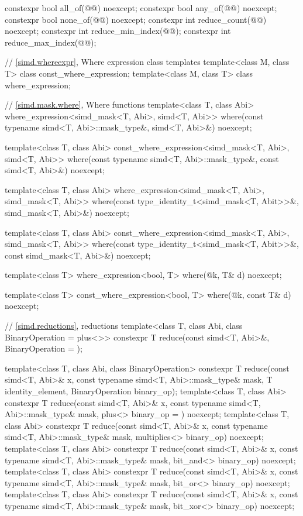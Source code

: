 \begin{codeblock}
{  constexpr bool all_of(@@) noexcept;
  constexpr bool any_of(@@) noexcept;
  constexpr bool none_of(@@) noexcept;
  constexpr int reduce_count(@@) noexcept;
  constexpr int reduce_min_index(@@);
  constexpr int reduce_max_index(@@);

  // \ref{simd.whereexpr}, Where expression class templates
  template<class M, class T> class const_where_expression;
  template<class M, class T> class where_expression;

  // \ref{simd.mask.where}, Where functions
  template<class T, class Abi>
    where_expression<simd_mask<T, Abi>, simd<T, Abi>>
      where(const typename simd<T, Abi>::mask_type&, simd<T, Abi>&) noexcept;

  template<class T, class Abi>
    const_where_expression<simd_mask<T, Abi>, simd<T, Abi>>
      where(const typename simd<T, Abi>::mask_type&, const simd<T, Abi>&) noexcept;

  template<class T, class Abi>
    where_expression<simd_mask<T, Abi>, simd_mask<T, Abi>>
      where(const type_identity_t<simd_mask<T, Abit>>&, simd_mask<T, Abi>&) noexcept;

  template<class T, class Abi>
    const_where_expression<simd_mask<T, Abi>, simd_mask<T, Abi>>
      where(const type_identity_t<simd_mask<T, Abit>>&, const simd_mask<T, Abi>&) noexcept;

  template<class T>
    where_expression<bool, T>
      where(@\seebelow@ k, T& d) noexcept;

  template<class T>
    const_where_expression<bool, T>
      where(@\seebelow@ k, const T& d) noexcept;

  // \ref{simd.reductions},  reductions
  template<class T, class Abi, class BinaryOperation = plus<>>
    constexpr T reduce(const simd<T, Abi>&, BinaryOperation = {});

  template<class T, class Abi, class BinaryOperation>
    constexpr T reduce(const simd<T, Abi>& x, const typename simd<T, Abi>::mask_type& mask,
                       T identity_element, BinaryOperation binary_op);
  template<class T, class Abi>
    constexpr T reduce(const simd<T, Abi>& x, const typename simd<T, Abi>::mask_type& mask,
                       plus<> binary_op = {}) noexcept;
  template<class T, class Abi>
    constexpr T reduce(const simd<T, Abi>& x, const typename simd<T, Abi>::mask_type& mask,
                       multiplies<> binary_op) noexcept;
  template<class T, class Abi>
    constexpr T reduce(const simd<T, Abi>& x, const typename simd<T, Abi>::mask_type& mask,
                       bit_and<> binary_op) noexcept;
  template<class T, class Abi>
    constexpr T reduce(const simd<T, Abi>& x, const typename simd<T, Abi>::mask_type& mask,
                       bit_or<> binary_op) noexcept;
  template<class T, class Abi>
    constexpr T reduce(const simd<T, Abi>& x, const typename simd<T, Abi>::mask_type& mask,
                       bit_xor<> binary_op) noexcept;

}
\end{codeblock}
